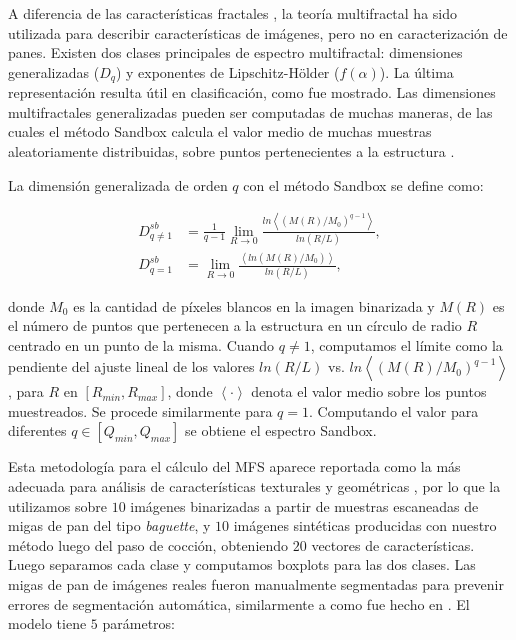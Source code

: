A diferencia de las características fractales \cite{Gonzales2008}, la teoría multifractal ha sido utilizada para describir características de imágenes, pero no en caracterización de panes.
Existen dos clases principales de espectro multifractal: dimensiones generalizadas ($D_{q}$) y exponentes de Lipschitz-H\"older ($f(\alpha)$). 
La última representación resulta útil en clasificación, como fue mostrado.
Las dimensiones multifractales generalizadas pueden ser computadas de muchas maneras, de las cuales el método Sandbox \cite{Tel1989} calcula el valor medio de muchas muestras aleatoriamente distribuidas, sobre puntos pertenecientes a la estructura \cite{Debartolo2004}. 

La dimensión generalizada de orden $q$ con el método Sandbox se define como:

 \begin{align*}
D_{q\ne 1}^{sb} &= \frac{1}{q-1} \lim_{R \rightarrow 0}{
\frac{ln   { \left\langle  (M(R)/M_{0})^{q-1} \right\rangle   }}
{ln {(R/L)}       }},\\
D_{q=1}^{sb} &= \lim_{R \rightarrow 0}{
\frac{ \left\langle ln   { (M(R)/M_{0})  }  \right\rangle}
{ln {(R/L)}       }},
\end{align*}

\noindent donde $M_{0}$ es la cantidad de píxeles blancos en la imagen binarizada y $M(R)$ es el número de puntos que pertenecen a la estructura en un círculo de radio $R$ centrado en un punto de la misma.
Cuando $q\ne1$, computamos el límite como la pendiente del ajuste lineal de los valores $ln(R/L)$ vs. $ ln  \left\langle  { (M(R)/M_{0})^{q-1} }  \right\rangle$, para $R$ en $[R_{min}, R_{max}]$, donde $ \left\langle \cdot  \right\rangle$ denota el valor medio sobre los puntos muestreados.
Se procede similarmente para $q=1$. 
Computando el valor para diferentes $q \in [Q_{min},Q_{max}]$  se obtiene el espectro Sandbox.

Esta metodología para el cálculo del MFS aparece reportada como la más adecuada para análisis de características texturales y geométricas \cite{Gonzales2008}, por lo que la utilizamos sobre $10$ imágenes binarizadas a partir de muestras escaneadas de migas de pan del tipo {\em baguette}, y $10$ imágenes sintéticas producidas con nuestro método luego del paso de cocción, obteniendo $20$ vectores de características.
Luego separamos cada clase y computamos boxplots para las dos clases.
Las migas de pan de imágenes reales fueron manualmente segmentadas para prevenir errores de segmentación automática, similarmente a como fue hecho en \cite{Bosch2011}.
El modelo tiene $5$ parámetros:

